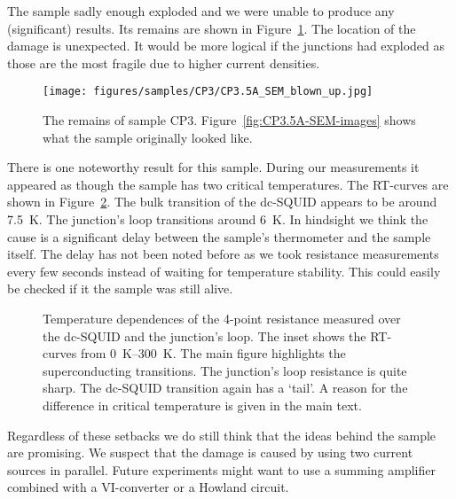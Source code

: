 The sample sadly enough exploded and we were unable to produce any (significant) results. Its remains are shown in Figure~\ref{fig:CP3.5A-remains}. The location of the damage is unexpected. It would be more logical if the junctions had exploded as those are the most fragile due to higher current densities.

\begin{figure}[ht!]	
	\centering
	\texttt{[image: figures/samples/CP3/CP3.5A\_SEM\_blown\_up.jpg]}
	\caption{The remains of sample CP3. Figure~\ref{fig:CP3.5A-SEM-images} shows what the sample originally looked like.}
	\label{fig:CP3.5A-remains}
\end{figure}

There is one noteworthy result for this sample. During our measurements it appeared as though the sample has two critical temperatures. The RT-curves are shown in Figure~\ref{fig:CP3.5A_RT_curves}. The bulk transition of the dc-SQUID appears to be around \qty{7.5}{\kelvin}. The junction's loop transitions around \qty{6}{\kelvin}. In hindsight we think the cause is a significant delay between the sample's thermometer and the sample itself. The delay has not been noted before as we took resistance measurements every few seconds instead of waiting for temperature stability. This could easily be checked if it the sample was still alive.

\begin{figure}[ht!]
	\centering
	
	\caption{Temperature dependences of the 4-point resistance measured over the dc-SQUID and the junction's loop. The inset shows the RT-curves from \qtyrange{0}{300}{\kelvin}. The main figure highlights the superconducting transitions. The junction's loop resistance is quite sharp. The dc-SQUID transition again has a `tail'. A reason for the difference in critical temperature is given in the main text.}
	\label{fig:CP3.5A_RT_curves}
\end{figure}

Regardless of these setbacks we do still think that the ideas behind the sample are promising. We suspect that the damage is caused by using two current sources in parallel. Future experiments might want to use a summing amplifier combined with a VI-converter or a Howland circuit.